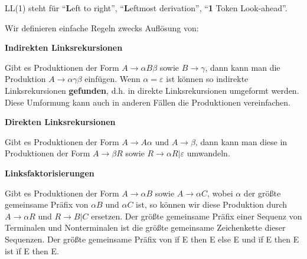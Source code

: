 LL(1) steht für ``\textbf{L}eft to right'', ``\textbf{L}eftmost derivation'', ``\textbf{1} Token Look-ahead''.

Wir definieren einfache Regeln zwecks Auflösung von:
\begin{\whichitem}
\item \textbf{Indirekten Linksrekursionen}

Gibt es Produktionen der Form $A \to \alpha B \beta$ sowie $B \to \gamma$, dann kann man die Produktion
$A \to \alpha \gamma \beta$ einfügen. Wenn $\alpha=\varepsilon$ ist können so indirekte Linksrekursionen \textbf{gefunden}, d.h. in direkte Linksrekursionen umgeformt werden.
Diese Umformung kann auch in anderen Fällen die Produktionen vereinfachen.
\item \textbf{Direkten Linksrekursionen}

Gibt es Produktionen der Form $A \to A \alpha$ und $A \to \beta$, dann kann man diese in Produktionen der Form $A \to \beta R$ sowie 
$R \to \alpha R | \varepsilon$ umwandeln.
\item \textbf{Linksfaktorisierungen}

Gibt es Produktionen der Form $A \to \alpha B$ sowie $A \to \alpha C$, wobei $\alpha$ der größte gemeinsame Präfix von $\alpha B$ und $\alpha C$ ist,
so können wir diese Produktion durch $A \to \alpha R$ und $R \to B | C$ ersetzen. Der größte gemeinsame Präfix einer Sequenz von Terminalen und Nonterminalen ist die größte
gemeinsame Zeichenkette dieser Sequenzen. Der größte gemeinsame Präfix von \u{if E then E else E} und \u{if E then E} ist \u{if E then E}.

\end{\whichitem}

